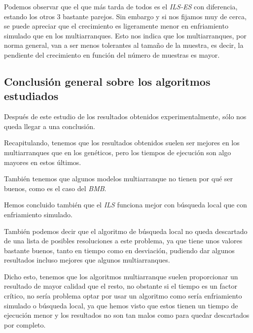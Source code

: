 Podemos observar que el que más tarda de todos es el \textit{ILS-ES} con diferencia, estando los otros 3 bastante parejos.
Sin embargo y si nos fijamos muy de cerca, se puede apreciar que el crecimiento es ligeramente menor en enfriamiento simulado que en los multiarranques. Esto nos indica que los multiarranques, por norma general, van a ser menos tolerantes al tamaño de la muestra, es decir, la pendiente del crecimiento en función del número de muestras es mayor.



\newpage

\subsection{Conclusión general sobre los algoritmos estudiados}

Después de este estudio de los resultados obtenidos experimentalmente, sólo nos queda llegar a una conclusión.

Recapitulando, tenemos que los resultados obtenidos suelen ser mejores en los multiarranques que en los genéticos, pero los tiempos de ejecución son algo mayores en estos últimos.

También tenemos que algunos modelos multiarranque no tienen por qué ser buenos, como es el caso del \textit{BMB}.

Hemos concluido también que el \textit{ILS} funciona mejor con búsqueda local que con enfriamiento simulado.

También podemos decir que el algoritmo de búsqueda local no queda descartado de una lista de posibles resoluciones a este problema, ya que tiene unos valores bastante buenos, tanto en tiempo como en desviación, pudiendo dar algunos resultados incluso mejores que algunos multiarranques.


Dicho esto, tenemos que los algoritmos multiarranque suelen proporcionar un resultado de mayor calidad que el resto, no obstante si el tiempo es un factor crítico, no sería problema optar por usar un algoritmo como sería enfriamiento simulado o búsqueda local, ya que hemos visto que estos tienen un tiempo de ejecución menor y los resultados no son tan malos como para quedar descartados por completo.








